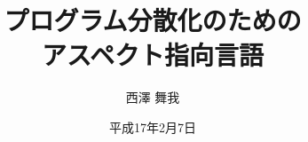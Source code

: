 \documentclass[11pt,oneside]{jbook}
\begin{document}
\title{%
プログラム分散化のための\\
アスペクト指向言語
}


\author{西澤 舞我}

\date{平成17年2月7日}





\maketitle


\begin{abstract}

\end{abstract}

\begin{acknowledgments}

\end{acknowledgments}


\tableofcontents       %

%
%

\listoffigures         %
\listoftables          %


%
%
%







%
%



\appendix

\end{document}
